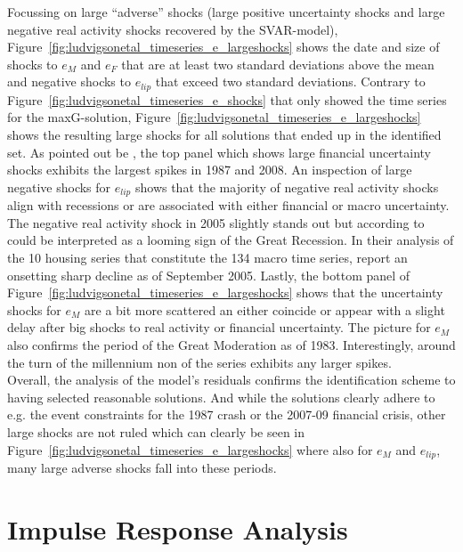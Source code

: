 \documentclass[a4paper,11pt,listof=nochaptergap,oneside,pointednumbers,bibtotoc,bigheadings,liststotoc,hidelinks]{scrbook}
\theoremstyle{mysatz}
\theoremstyle{mydefinition}
\theoremstyle{mytheorem}
\theoremstyle{mybemerkung}
\begin{document}
Focussing on large ``adverse'' shocks (large positive uncertainty shocks and large negative real activity shocks recovered by the SVAR-model), Figure~\ref{fig:ludvigsonetal_timeseries_e_largeshocks} shows the date and size of shocks to $e_M$ and $e_F$ that are at least two standard deviations above the mean and negative shocks to $e_{lip}$ that exceed two standard deviations. Contrary to Figure~\ref{fig:ludvigsonetal_timeseries_e_shocks} that only showed the time series for the maxG-solution, Figure~\ref{fig:ludvigsonetal_timeseries_e_largeshocks} shows the resulting large shocks for all solutions that ended up in the identified set. As pointed out be \citet{ludvigsonetal:18}, the top panel which shows large financial uncertainty shocks exhibits the largest spikes in 1987 and 2008. An inspection of large negative shocks for $e_{lip}$ shows that the majority of negative real activity shocks align with recessions or are associated with either financial or macro uncertainty. The negative real activity shock in 2005 slightly stands out but according to \citet{ludvigsonetal:18} could be interpreted as a looming sign of the Great Recession. In their analysis of the 10 housing series that constitute the 134 macro time series, \citet{ludvigsonetal:18} report an onsetting sharp decline as of September 2005. Lastly, the bottom panel of Figure~\ref{fig:ludvigsonetal_timeseries_e_largeshocks} shows that the uncertainty shocks for $e_M$ are a bit more scattered an either coincide or appear with a slight delay after big shocks to real activity or financial uncertainty. The picture for $e_M$ also confirms the period of the Great Moderation as of 1983. Interestingly, around the turn of the millennium non of the series exhibits any larger spikes.\\

Overall, the analysis of the model's residuals confirms the identification scheme to having selected reasonable solutions. And while the solutions clearly adhere to e.g. the event constraints for the 1987 crash or the 2007-09 financial crisis, other large shocks are not ruled which can clearly be seen in Figure~\ref{fig:ludvigsonetal_timeseries_e_largeshocks} where also for $e_M$ and $e_{lip}$, many large adverse shocks fall into these periods.





\section[Impulse Response Analysis]{Impulse Response Analysis}
\label{sec:ImpulseResponseAnalysis}
\end{document}
